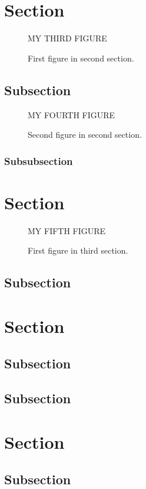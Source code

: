 \documentclass[12pt,econ]{sources/authesis}
\theoremstyle{definition}
\theoremstyle{definition}
\theoremstyle{definition}
\theoremstyle{remark}
\begin{document}
\section{Section}\label{section-1}
\begin{figure}
\centering MY THIRD FIGURE
\caption{First figure in second section.}
\end{figure}
\subsection{Subsection}\label{subsection-1}
\begin{figure}
\centering MY FOURTH FIGURE
\caption{Second figure in second section.}
\end{figure}
\subsubsection{Subsubsection}\label{subsubsection-1}

\section{Section}\label{section-2}
\begin{figure}
\centering MY FIFTH FIGURE
\caption{First figure in third section.}
\end{figure}
\subsection{Subsection}\label{subsection-2}

\section{Section}\label{section-3}

\subsection{Subsection}\label{subsection-3}

\subsection{Subsection}\label{subsection-4}

\section{Section}\label{section-4}

\subsection{Subsection}\label{subsection-5}
\end{document}

